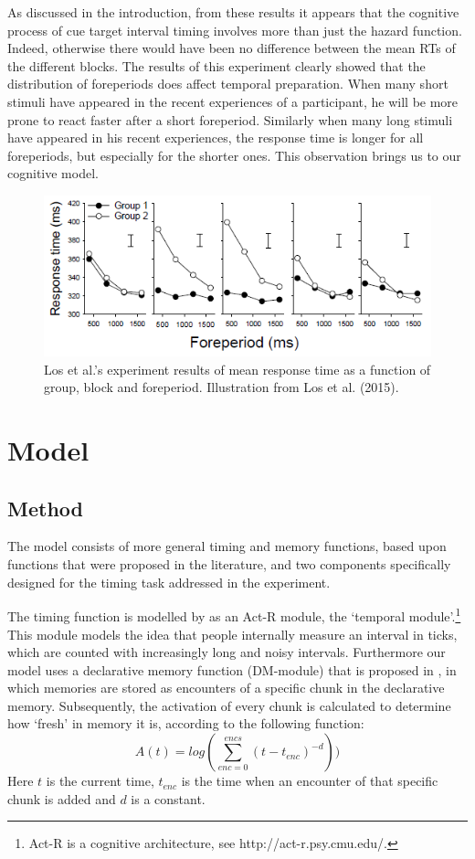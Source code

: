 \documentclass[10pt,letterpaper]{article}
\begin{document}
As discussed in the introduction, from these results it appears that the cognitive process of cue target interval timing involves more than just the hazard function. Indeed, otherwise there would have been no difference between the mean RTs of the different blocks. The results of this experiment clearly showed that the distribution of foreperiods does affect temporal preparation. When many short stimuli have appeared in the recent experiences of a participant, he will be more prone to react faster after a short foreperiod. Similarly when many long stimuli have appeared in his recent experiences, the response time is longer for all foreperiods, but especially for the shorter ones. This observation brings us to our cognitive model.

\begin{figure}
	\centering
	\includegraphics[width=\columnwidth]{Los1.png}
	\caption{Los et al.'s experiment results of mean response time as a function of group, block and foreperiod. Illustration from Los et al. (2015).}
	\label{LosFigure}
\end{figure}

\section{Model}
\subsection{Method}
The model consists of more general timing and memory functions, based upon functions that were proposed in the literature, and two components specifically designed for the timing task addressed in the experiment. 

The timing function is modelled by \citet{Taatgen1} as an Act-R module, the `temporal module'.\footnote{Act-R is a cognitive architecture, see http://act-r.psy.cmu.edu/.} This module models the idea that people internally measure an interval in ticks, which are counted with increasingly long and noisy intervals. Furthermore our model uses a declarative memory function (DM-module) that is proposed in \citet{Taatgen}, in which memories are stored as encounters of a specific chunk in the declarative memory. Subsequently, the activation of every chunk is calculated to determine how `fresh' in memory it is, according to the following function:
\begin{equation}
	A(t) = log(\sum_{enc = 0}^{encs}(t - t_{enc})^{-d}))
\end{equation}
Here $t$ is the current time, $t_{enc}$ is the time when an encounter of that specific chunk is added and $d$ is a constant.
\end{document}
